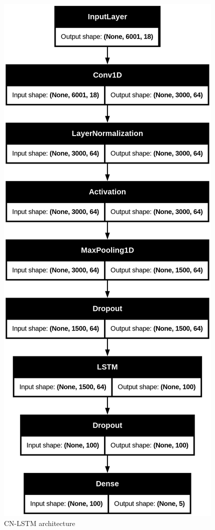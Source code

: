 \begin{figure}[H]
\centering
\includegraphics[scale=.1, angle=90]{figs/fcn-lstm.png}
\caption{CN-LSTM architecture}
\label{fig1}
\end{figure}

